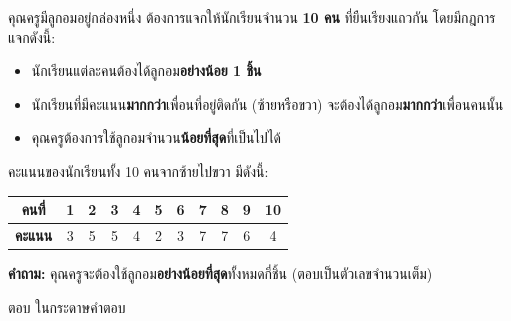 \question คุณครูมีลูกอมอยู่กล่องหนึ่ง ต้องการแจกให้นักเรียนจำนวน \textbf{10 คน} ที่ยืนเรียงแถวกัน โดยมีกฎการแจกดังนี้:

\begin{itemize}
  \item นักเรียนแต่ละคนต้องได้ลูกอม\textbf{อย่างน้อย 1 ชิ้น}
  \item นักเรียนที่มีคะแนน\textbf{มากกว่า}เพื่อนที่อยู่ติดกัน (ซ้ายหรือขวา) จะต้องได้ลูกอม\textbf{มากกว่า}เพื่อนคนนั้น
  \item คุณครูต้องการใช้ลูกอมจำนวน\textbf{น้อยที่สุด}ที่เป็นไปได้
\end{itemize}

คะแนนของนักเรียนทั้ง 10 คนจากซ้ายไปขวา มีดังนี้:

\begin{center}
\begin{tabular}{|c|c|c|c|c|c|c|c|c|c|c|}
\hline
\textbf{คนที่} & 1 & 2 & 3 & 4 & 5 & 6 & 7 & 8 & 9 & 10 \\
\hline
\textbf{คะแนน} & 3 & 5 & 5 & 4 & 2 & 3 & 7 & 7 & 6 & 4 \\
\hline
\end{tabular}
\end{center}

\medskip
\textbf{คำถาม:} คุณครูจะต้องใช้ลูกอม\textbf{อย่างน้อยที่สุด}ทั้งหมดกี่ชิ้น (ตอบเป็นตัวเลขจำนวนเต็ม)

\par\medskip
ตอบ ในกระดาษคำตอบ
%
%
%
